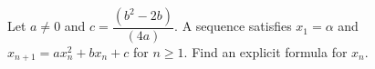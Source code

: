 Let $a\ne0$ and $c=\dfrac{(b^2-2b)}{(4a)}$. A sequence satisfies $x_1=\alpha$ and $x_{n+1}=ax_n^2+bx_n+c$ for $n\ge1$. Find an explicit formula for $x_n$.
